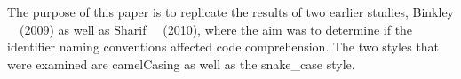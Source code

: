 The purpose of this paper is to replicate the results of two earlier studies, Binkley \etal ~~(2009) as well as Sharif \etal ~~(2010), where the aim was to determine if the identifier naming conventions affected code comprehension. The two styles that were examined are camelCasing as well as the snake\_case style.
